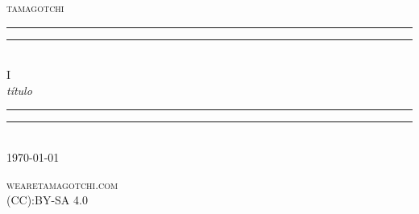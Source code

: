 
\begin{titlepage}
\centering

\settowidth{\unitlength}{\LARGE WE ARE TAMAGOTCHI}

\vspace*{\baselineskip}

{\Large\scshape tamagotchi}\\[\baselineskip]

\rule{\unitlength}{1.6pt}\vspace*{-\baselineskip}\vspace*{2pt}
\rule{\unitlength}{0.4pt}\\[\baselineskip]

{\LARGE I}\\[\baselineskip]

{\itshape título}\\[0.2\baselineskip]

\rule{\unitlength}{0.4pt}\vspace*{-\baselineskip}\vspace{3.2pt}
\rule{\unitlength}{1.6pt}\\[\baselineskip]

{\large\scshape \today}\par

\vfill

{\large\scshape wearetamagotchi.com}\\[\baselineskip]
{\small\scshape (CC):BY-SA 4.0}\par

\end{titlepage}